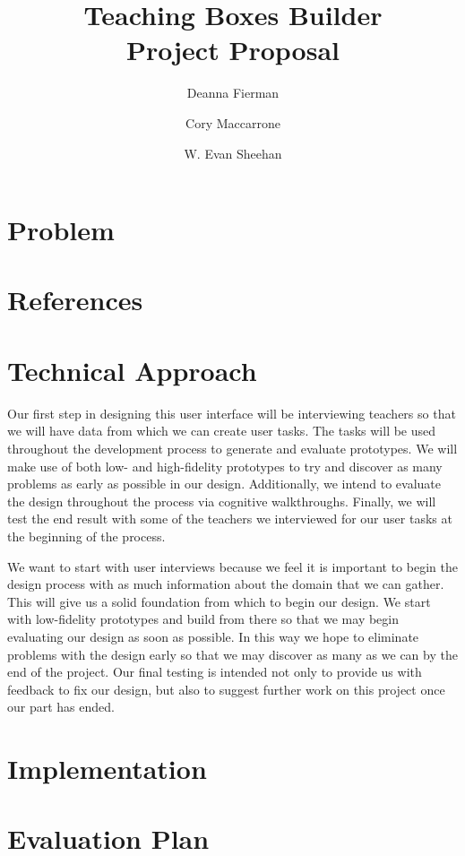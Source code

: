 \documentclass[11pt,letter]{article}
\title{Teaching Boxes Builder\\Project Proposal}
\author{Deanna Fierman \and Cory Maccarrone \and W. Evan Sheehan}
\begin{document}
\begin{titlepage}
	\maketitle
	\thispagestyle{empty}
\end{titlepage}

\section{Problem}

\section{References}

\section{Technical Approach}
Our first step in designing this user interface will be interviewing teachers so
that we will have data from which we can create user tasks. The tasks will be
used throughout the development process to generate and evaluate prototypes. We
will make use of both low- and high-fidelity prototypes to try and discover as
many problems as early as possible in our design. Additionally, we intend to
evaluate the design throughout the process via cognitive walkthroughs. Finally,
we will test the end result with some of the teachers we interviewed for our
user tasks at the beginning of the process.

We want to start with user interviews because we feel it is important to begin
the design process with as much information about the domain that we can gather.
This will give us a solid foundation from which to begin our design. We start
with low-fidelity prototypes and build from there so that we may begin
evaluating our design as soon as possible. In this way we hope to eliminate
problems with the design early so that we may discover as many as we can by the
end of the project. Our final testing is intended not only to provide us with
feedback to fix our design, but also to suggest further work on this project
once our part has ended.

\section{Implementation}

\section{Evaluation Plan}
\end{document}
